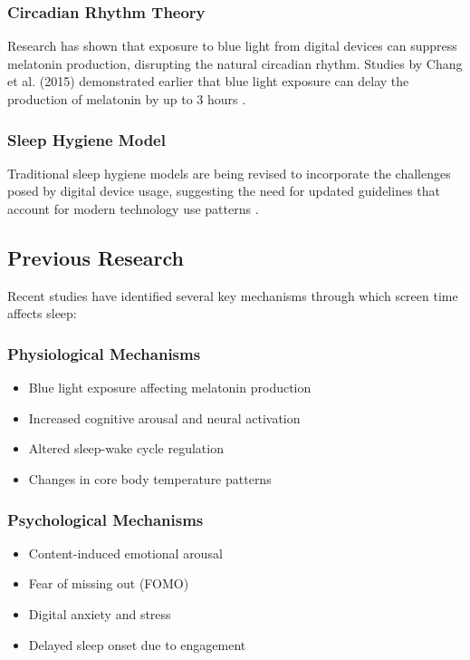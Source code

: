 \documentclass[conference]{IEEEtran}
\begin{document}
\subsubsection{Circadian Rhythm Theory}
Research has shown that exposure to blue light from digital devices can suppress melatonin production, disrupting the natural circadian rhythm. Studies by Chang et al. (2015) demonstrated earlier that blue light exposure can delay the production of melatonin by up to 3 hours \cite{chang2015}.

\subsubsection{Sleep Hygiene Model}
Traditional sleep hygiene models are being revised to incorporate the challenges posed by digital device usage, suggesting the need for updated guidelines that account for modern technology use patterns \cite{cajochen2011}.

\subsection{Previous Research}
Recent studies have identified several key mechanisms through which screen time affects sleep:

\subsubsection{Physiological Mechanisms}
\begin{itemize}
\item Blue light exposure affecting melatonin production \cite{chang2015}
\item Increased cognitive arousal and neural activation \cite{heath2014}
\item Altered sleep-wake cycle regulation \cite{cajochen2011}
\item Changes in core body temperature patterns
\end{itemize}

\subsubsection{Psychological Mechanisms}
\begin{itemize}
\item Content-induced emotional arousal
\item Fear of missing out (FOMO)
\item Digital anxiety and stress
\item Delayed sleep onset due to engagement
\end{itemize}
\end{document}

